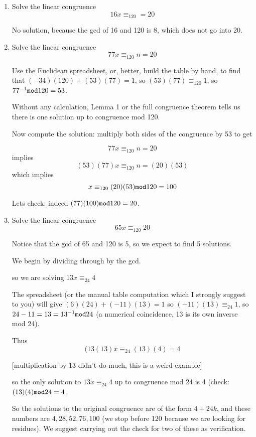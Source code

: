 \documentclass[12pt]{article}
\begin{document}
\begin{enumerate}

\item Solve the linear congruence $$16x \equiv_{120} = 20$$

No solution, because the gcd of 16 and 120 is 8, which does not go into 20.

\item Solve the linear congruence $$77x \equiv_{120}n= 20$$

Use the Euclidean spreadsheet, or, better, build the table by hand, to find that $(-34)(120) + (53)(77) = 1$, so $(53)(77) \equiv_{120} 1$, so $77^{-1}{\tt mod}120 = 53$.

Without any calculation, Lemma 1 or the full congruence theorem tells us there is one solution up to congruence mod 120.

Now compute the solution:  multiply both sides of the congruence by 53 to get

$$77x \equiv_{120}n= 20$$
implies
$$(53)(77)x \equiv_{120}n= (20)(53)$$
which implies
$$x \equiv_{120} (20)(53){\tt mod}120 = 100$$

Lets check:  indeed $(77)(100){\tt mod} 120 = 20$.

\item Solve the linear congruence $$65x \equiv_{120} 20$$

Notice that the gcd of 65 and 120 is 5, so we expect to find 5 solutions.

We begin by dividing through by the gcd.

so we are solving $13x \equiv_{24} 4$

The spreadsheet (or the manual table computation which I strongly suggest to you) will give $(6)(24) + (-11)(13) = 1$
so $(-11)(13) \equiv_{24} 1$, so $24-11 = 13 = 13^{-1}{\tt mod} 24$ (a numerical coincidence, 13 is its own inverse mod 24).

Thus $$(13(13)x \equiv_{24} (13)(4) = 4$$

[multiplication by 13 didn't do much, this is a weird example]

so the only solution to $13x \equiv_{24} 4$ up to congruence mod 24 is 4 (check:  $(13)(4) {\tt mod} 24 = 4$.

So the solutions to the original congruence are of the form $4+24k$, and these numbers
are $4, 28, 52, 76, 100$ (we stop before 120 because we are looking for residues).  We suggest carrying out the check
for two of these as verification.




\end{enumerate}
\end{document}
